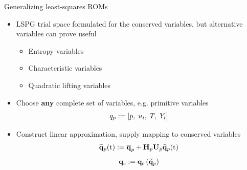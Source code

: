 \documentclass[]{beamer}
\begin{document}
\begin{frame}{Generalizing least-squares ROMs}
    \begin{itemize}
		\item LSPG trial space formulated for the conserved variables, but alternative variables can prove useful
		\begin{itemize}
			\item Entropy variables
			\item Characteristic variables
			\item Quadratic lifting variables
		\end{itemize}
		\item Choose \textbf{any} complete set of variables, e.g. primitive variables
		\begin{equation*}
			q_p := \left[ p, \; u_i, \; T, \; Y_l \right]
		\end{equation*}
		\item Construct linear approximation, supply mapping to conserved variables
		\begin{equation*}
			\primVecRom(\timeVar) \defEq \primVecCent + \primScale \primTrial \primVecCoef(\timeVar)
		\end{equation*}
		\begin{equation*}
			\mathbf{q}_{c} := \mathbf{q}_{c} \left( \mathbf{\widetilde{q}}_{p} \right)
		\end{equation*}
	\end{itemize}
\end{frame}
\end{document}
